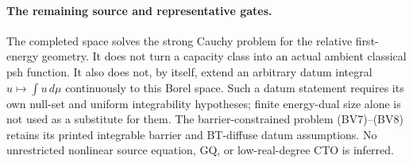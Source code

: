\paragraph{The remaining source and representative gates.}
The completed space solves the strong Cauchy problem for the
relative first-energy geometry. It does not turn a capacity
class into an actual ambient classical psh function. It also
does not, by itself, extend an arbitrary datum integral
$u\mapsto\int u\,d\mu$ continuously to this Borel space.
Such a datum statement requires its own null-set and uniform
integrability hypotheses; finite energy-dual size alone is
not used as a substitute for them. The barrier-constrained
problem (BV7)--(BV8) retains its printed integrable barrier
and BT-diffuse datum assumptions. No unrestricted nonlinear
source equation, GQ, or low-real-degree CTO is inferred.
